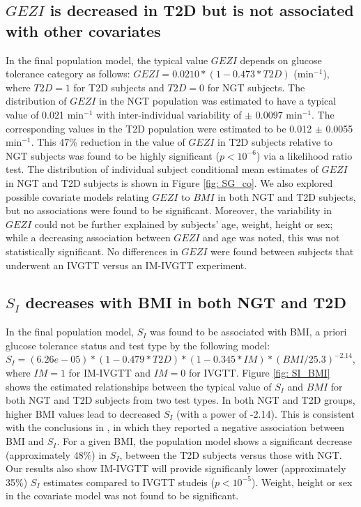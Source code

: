 \documentclass[utf8]{frontiersSCNS} %
\begin{document}
\vskip 0.5cm
\subsection{$GEZI$ is decreased in T2D but is not associated with other covariates}
In the final population model, the typical value $GEZI$ depends on glucose tolerance category as follows: $GEZI=0.0210*(1-0.473*T2D)$ (min$^{-1}$), where $T2D=1$ for T2D subjects and $T2D=0$ for NGT subjects. The distribution of $GEZI$  in the NGT population was estimated to have a typical value of 0.021 min$^{-1}$  with inter-individual variability of $\pm$ 0.0097 min$^{-1}$. The corresponding values in the T2D population were estimated to be 0.012 $\pm$ 0.0055 min$^{-1}$. This 47\% reduction in the value of $GEZI$ in T2D subjects relative to NGT subjects was found to be highly significant ($p<10^{-6}$) via a likelihood ratio test. The distribution of  individual subject conditional mean estimates of $GEZI$ in NGT and T2D subjects is shown in Figure \ref{fig: SG_co}. We also explored possible covariate models relating $GEZI$ to $BMI$ in both NGT and T2D subjects, but no associations were found to be significant. Moreover, the variability in $GEZI$ could not be further explained by subjects’ age, weight, height or sex; while a decreasing association between $GEZI$ and age was noted, this was not statistically significant. No differences in $GEZI$ were found between subjects that underwent an IVGTT versus an IM-IVGTT experiment.

\vskip 0.5cm
\subsection{$S_I$ decreases with BMI in both NGT and T2D}
In the final population model, $S_I$ was found to be associated with BMI, a priori glucose tolerance status and test type by the following model: $S_I=(6.26e-05)*(1-0.479*T2D)*(1-0.345*IM)*(BMI/25.3)^{-2.14}$, where $IM=1$ for IM-IVGTT and $IM=0$ for IVGTT. Figure \ref{fig: SI_BMI} shows the estimated relationships between the typical value of $S_I$ and $BMI$ for both NGT and T2D subjects from two test types. In both NGT and T2D groups, higher BMI values lead to decreased $S_I$ (with a power of -2.14). This is consistent with the conclusions in \citet{Bergman1997TheTolerance}, in which they reported a negative association between BMI and $S_I$. For a given BMI, the population model shows a significant decrease (approximately 48\%) in $S_I$, between the T2D subjects versus those with NGT. Our results also show IM-IVGTT will provide significanly lower (approximately 35\%) $S_I$ estimates compared to IVGTT studeis ($p<10^{-5}$). Weight, height or sex in the covariate model was not found to be significant.\\
\end{document}
